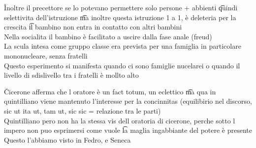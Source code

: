 \documentclass[12pt]{article}
\begin{document}
\v

Inoltre il precettore se lo potevano permettere solo persone + abbienti \t quindi selettivita dell'istruzione \t ma inoltre questa istruzione 1 a 1, è deleteria per la crescita \t il bambino non entra in contatto con altri bambini \\
Nella socialita il bambino è facilitato a uscire dalla fase anale (freud) \\
La scula intesa come gruppo classe era prevista per una famiglia in particolare mononucleare, senza fratelli \\
Questo esperimento si manifesta quando ci sono famiglie nucelarei o quando il livello di sdislivello tra i fratelli è mollto alto

\v

Cicerone afferma che l oratore è un fact totum, un eclettico \t ma qua in quintilliano viene mantenuto l'interesse per la concinnitas (equilibirio nel discorso, sic ut ita ut, tam ut, sic sic = relazione tra le parti) \\
Quintilliano pero non ha la stessa vis dell oratoria di cicerone, perche sotto l impero non puo esprimersi come vuole \t la maglia ingabbiante del potere è presente \\
Questo l'abbiamo visto in Fedro, e Seneca
\end{document}
